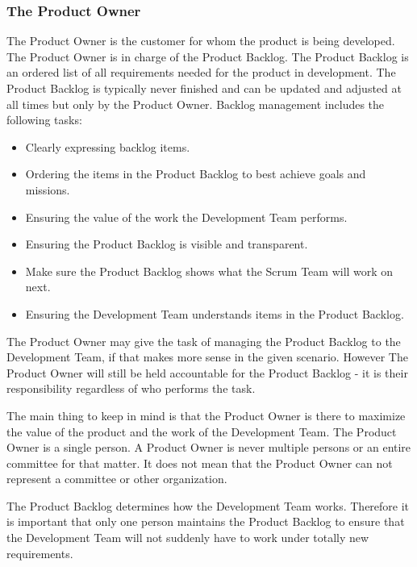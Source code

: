 \subsubsection{The Product Owner}

The Product Owner is the customer for whom the product is being developed.
The Product Owner is in charge of the Product Backlog\cite{scrumguide11}. The
Product Backlog is an ordered list of all requirements needed for the product in
development. The Product Backlog is typically never finished and can be updated 
and adjusted at all times but only by the Product
Owner\cite{scrumguide11}. Backlog management includes the following tasks:

\begin{itemize}
	\item Clearly expressing backlog items.
	\item	Ordering the items in the Product Backlog to best achieve goals and missions.
	\item	Ensuring the value of the work the Development Team performs.
	\item	Ensuring the Product Backlog is visible and transparent.
	\item	Make sure the Product Backlog shows what the Scrum Team will work on next.
	\item	Ensuring the Development Team understands items in the Product
	Backlog.\cite{scrumguide11}
\end{itemize}

The Product Owner may give the task of managing the Product Backlog to the
Development Team, if that makes more sense in the given
scenario\cite{scrumguide11}. However The Product Owner will still be held
 accountable for the Product Backlog - it is their responsibility regardless of who
performs the task\cite{scrumguide11}.


The main thing to keep in mind is that the Product Owner is there to maximize the value of
the product and the work of the Development Team\cite{scrumguide11}.  The Product Owner is a
single person. A Product Owner is never multiple persons or an entire committee for that
matter. It does not mean that the Product Owner can not represent a committee or
other organization\cite{scrumguide11}.


The Product Backlog determines how the Development Team works. Therefore it is important
that only one person maintains the Product Backlog to ensure that the Development Team will
not suddenly have to work under totally new requirements\cite{scrumguide11}.
